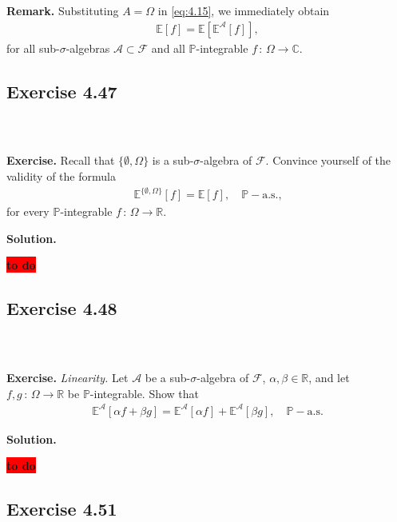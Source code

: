 \documentclass{beamer}
\numberwithin{equation}{section}
\newcommand{\task}[1]{
    \begin{center}
        \colorbox{red}{
            \textsf{
                \textbf{#1}
            }
        }
    \end{center}
}
\newenvironment{frame2}{\begin{frame}\frametitle{{\normalsize \secname} \\ {\large \subsecname}}}{\end{frame}}
\begin{document}
\begin{frame2}
    \textbf{Remark.}
    Substituting $A = \Omega$ in \eqref{eq:4.15}, we immediately obtain
    \begin{align}
        \mathbb{E}[f] = \mathbb{E}\left[\mathbb{E}^\mathcal{A}\left[f\right]\right],
    \end{align}
    for all sub-$\sigma$-algebras $\mathcal{A} \subset \mathcal{F}$ and all $\mathbb{P}$-integrable $f \, : \, \Omega \rightarrow \mathbb{C}$.
\end{frame2}

\subsection{Exercise 4.47}

\begin{frame2}
    \textbf{Exercise.}
    Recall that $\{\emptyset,\Omega\}$ is a sub-$\sigma$-algebra of $\mathcal{F}$.
    Convince yourself of the validity of the formula
    \begin{align}
        \mathbb{E}^{\{\emptyset,\Omega\}}[f] = \mathbb{E}[f],\quad \mathbb{P}-\text{a.s.,}
    \end{align}
    for every $\mathbb{P}$-integrable $f \, : \, \Omega \rightarrow \mathbb{R}$.

    \vspace{10pt}
    \textbf{Solution.}
    \task{to do}
\end{frame2}

\subsection{Exercise 4.48}

\begin{frame2}
    \textbf{Exercise.}
    \textit{Linearity.}
    Let $\mathcal{A}$ be a sub-$\sigma$-algebra of $\mathcal{F}$, $\alpha,\beta \in \mathbb{R}$, and let $f,g \, : \, \Omega \rightarrow \mathbb{R}$ be $\mathbb{P}$-integrable.
    Show that
    \begin{align}
        \mathbb{E}^\mathcal{A}[\alpha f + \beta g] = \mathbb{E}^\mathcal{A}[\alpha f] + \mathbb{E}^\mathcal{A}[\beta g], \quad \mathbb{P}-\text{a.s.} 
    \end{align}

    \vspace{10pt}
    \textbf{Solution.}
    \task{to do}
\end{frame2}

\subsection{Exercise 4.51}
\end{document}
